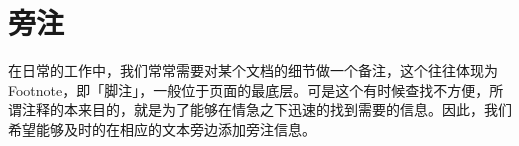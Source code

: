 \documentclass[color=green,mathpazo,titlestyle=hang]{elegantbook}\usepackage[]{graphicx}\usepackage[]{color}
\begin{document}
\section{旁注}
在日常的工作中，我们常常需要对某个文档的细节做一个备注，这个往往体现为 Footnote，即「脚注」，一般位于页面的最底层。可是这个有时候查找不方便，所谓注释的本来目的，就是为了能够在情急之下迅速的找到需要的信息。因此，我们希望能够及时的在相应的文本旁边添加旁注信息。

\end{document}
